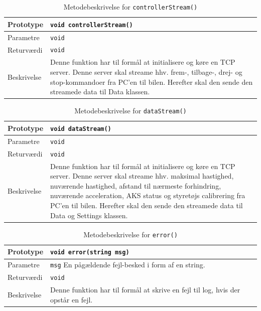 \begin{table}[h]
\begin{tabularx}{\textwidth}{| L{2.5 cm} | Z |} \hline
Prototype 	& \texttt{void controllerStream()} \\\hline
Parametre 	& \texttt{void}				\newline \\\hline
Returværdi	& \texttt{void} 			\newline \\\hline
Beskrivelse	& Denne funktion har til formål at initialisere og køre en TCP server. Denne server skal streame hhv. frem-, tilbage-, drej- og stop-kommandoer fra PC'en til bilen. Herefter skal den sende den streamede data til Data klassen. \\\hline
\end{tabularx}
\caption{Metodebeskrivelse for \texttt{controllerStream()}}
\label{table:met_controllerstream}
\end{table}

\clearpage

\begin{table}[h]
\begin{tabularx}{\textwidth}{| L{2.5 cm} | Z |} \hline
Prototype 	& \texttt{void dataStream()} \\\hline
Parametre 	& \texttt{void}				\newline \\\hline
Returværdi	& \texttt{void} 			\newline \\\hline
Beskrivelse	& Denne funktion har til formål at initialisere og køre en TCP server. Denne server skal streame hhv. maksimal hastighed, nuværende hastighed, afstand til nærmeste forhindring, nuværende acceleration, AKS status og styretøjs calibrering fra PC'en til bilen. Herefter skal den sende den streamede data til Data og Settings klassen. \\\hline
\end{tabularx}
\caption{Metodebeskrivelse for \texttt{dataStream()}}
\label{table:met_datastream}
\end{table}

\begin{table}[h]
\begin{tabularx}{\textwidth}{| L{2.5 cm} | Z |} \hline
Prototype 	& \texttt{void error(string msg)} \\\hline
Parametre 	& \texttt{msg}				\newline En pågældende fejl-besked i form af en string. \\\hline
Returværdi	& \texttt{void} 			\newline \\\hline
Beskrivelse	& Denne funktion har til formål at skrive en fejl til log, hvis der opstår en fejl. \newline \\\hline
\end{tabularx}
\caption{Metodebeskrivelse for \texttt{error()}}
\label{table:met_error}
\end{table}